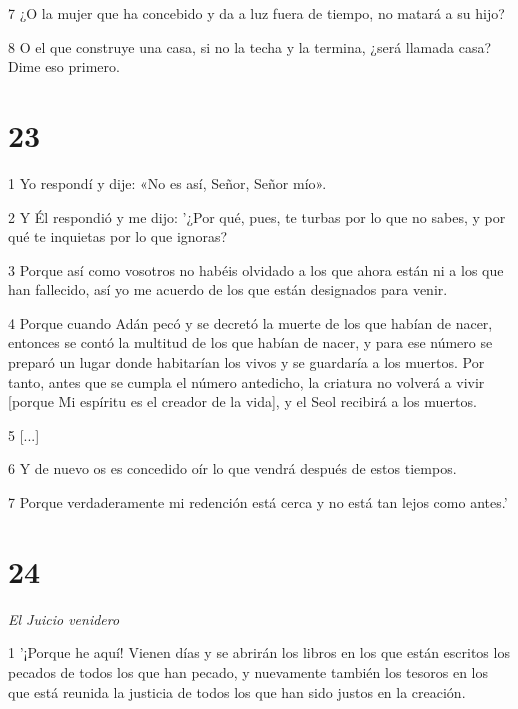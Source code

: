 \par 7 ¿O la mujer que ha concebido y da a luz fuera de tiempo, no matará a su hijo?

\par 8 O el que construye una casa, si no la techa y la termina, ¿será llamada casa? Dime eso primero.

\chapter{23}

\par 1 Yo respondí y dije: «No es así, Señor, Señor mío».

\par 2 Y Él respondió y me dijo: '¿Por qué, pues, te turbas por lo que no sabes, y por qué te inquietas por lo que ignoras?

\par 3 Porque así como vosotros no habéis olvidado a los que ahora están ni a los que han fallecido, así yo me acuerdo de los que están designados para venir.

\par 4 Porque cuando Adán pecó y se decretó la muerte de los que habían de nacer, entonces se contó la multitud de los que habían de nacer, y para ese número se preparó un lugar donde habitarían los vivos y se guardaría a los muertos. Por tanto, antes que se cumpla el número antedicho, la criatura no volverá a vivir [porque Mi espíritu es el creador de la vida], y el Seol recibirá a los muertos.

\par 5 [...]

\par 6 Y de nuevo os es concedido oír lo que vendrá después de estos tiempos.

\par 7 Porque verdaderamente mi redención está cerca y no está tan lejos como antes.'

\chapter{24}

\par \textit{El Juicio venidero}

\par 1 '¡Porque he aquí! Vienen días y se abrirán los libros en los que están escritos los pecados de todos los que han pecado, y nuevamente también los tesoros en los que está reunida la justicia de todos los que han sido justos en la creación.

